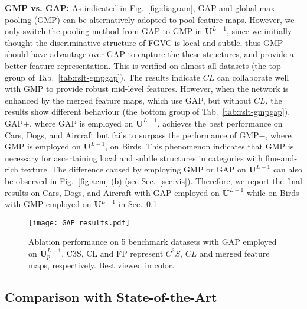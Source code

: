 \documentclass[10pt,twocolumn,letterpaper]{article}
\begin{document}
\textbf{GMP vs. GAP:} As indicated in Fig.~\ref{fig:diagram}, GAP and global max pooling (GMP) can be alternatively adopted to pool feature maps. However, we only switch the pooling method from GAP to GMP in $\mathbf{U}^{L-1}$, since we initially thought the discriminative structure of FGVC is local and subtle, thus GMP should have advantage over GAP to capture the these structures, and provide a better feature representation. This is verified on almost all datasets (the top group of Tab.~\ref{tab:rslt-gmpgap}). The results indicate $CL$ can collaborate well with GMP to provide robust mid-level features. However, when the network is enhanced by the merged feature maps, which use GAP, but without $CL$, the results show different behaviour (the bottom group of Tab.~\ref{tab:rslt-gmpgap}). GAP{\scriptsize$+$}, where GAP is employed on $\mathbf{U}^{L-1}$, achieves the best performance on Cars, Dogs, and Aircraft but fails to surpass the performance of GMP{\scriptsize$-$}, where GMP is employed on $\mathbf{U}^{L-1}$, on Birds. This phenomenon indicates that GMP is necessary for ascertaining local and subtle structures in categories with fine-and-rich texture. The difference caused by employing GMP or GAP on $\mathbf{U}^{L-1}$ can also be observed in Fig.~\ref{fig:acm} (b) (see Sec.~\ref{sec:vis}).
Therefore, we report the final results on Cars, Dogs, and Aircraft with GAP employed on $\mathbf{U}^{L-1}$ while on Birds with GMP employed on $\mathbf{U}^{L-1}$ in Sec.~\ref{sec:rslt}    







\begin{figure}[t]
\begin{center}
   \texttt{[image: GAP\_results.pdf]}
\end{center}
   \caption{Ablation performance on 5 benchmark datasets with GAP employed on $\mathbf{U}_p^{L-1}$. C3S, CL and FP represent $C^3S$, $CL$ and merged feature maps, respectively. Best viewed in color.}
\label{fig:gapresults}
\end{figure}







\subsection{Comparison with State-of-the-Art}
\label{sec:rslt}
\end{document}
